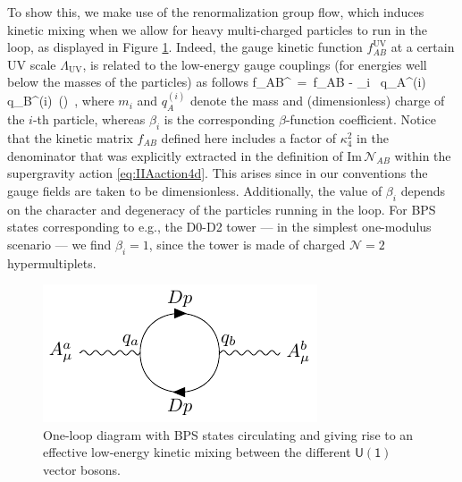 To show this, we make use of the  renormalization group flow, which induces kinetic mixing when we allow for heavy multi-charged particles to run in the loop, as displayed in Figure \ref{kineticmixing}. Indeed, the gauge kinetic function $f_{AB}^{\text{UV}}$ at a certain UV scale $\Lambda_{\text{UV}}$, is related to the low-energy gauge couplings (for energies well below the masses of the particles) as follows
		\beq \label{eq:oneloopmixing}
		f_{AB}^{}\, =\, f_{AB} - \sum_i \ q_{A}^{(i)} q_{B}^{(i)}\ \log \left(\right)\, ,
		\eeq
where $m_i$ and $q_{A}^{(i)}$ denote the mass and (dimensionless) charge of the $i$-th particle, whereas $\beta_i$ is the corresponding $\beta$-function coefficient. Notice that the kinetic matrix $f_{AB}$ defined here includes a factor of $\kappa_4^{2}$ in the denominator that was explicitly extracted in the definition of $\text{Im}\, \mathcal{N}_{AB}$ within the supergravity action \eqref{eq:IIAaction4d}. This arises since in our conventions the gauge fields are taken to be dimensionless. Additionally, the value of $\beta_i$ depends on the character and degeneracy of the particles running in the loop. For BPS states corresponding to e.g., the D0-D2 tower --- in the simplest one-modulus scenario --- we find $\beta_i= 1$, since the tower is made of charged $\mathcal{N}=2$ hypermultiplets.
		
		\begin{figure}[tb]
			\begin{center}
				\includegraphics[scale=1.2]{kinetic_mixing.pdf}
				\caption{One-loop diagram with BPS states circulating and giving rise to an effective low-energy kinetic mixing between the different $\mathsf{U(1)}$ vector bosons.}
				\label{kineticmixing}
			\end{center}
		\end{figure}
		

